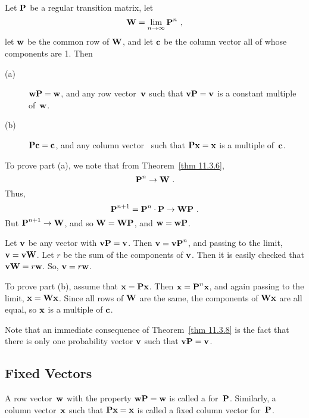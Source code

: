 \begin{theorem}\label{thm 11.3.8}
Let ${\mbox{\bf P}\/}$ be a regular transition matrix, let 
$${\mbox{\bf W}\/} = \lim_{n \rightarrow \infty} {\mbox{\bf P}\/}^n\ ,$$
let ${\mbox{\bf w}\/}$ be the common row of ${\mbox{\bf W}\/}$, and let ${\mbox{\bf c}\/}$ be the column
vector all of
whose components are 1.  Then
\begin{description}
\item[(a)]
${\mbox{\bf w}\/}{\mbox{\bf P}\/} =
{\mbox{\bf w}\/}$, and any row vector~${\mbox{\bf v}\/}$ such that ${\mbox{\bf v}\/}{\mbox{\bf P}\/} = {\mbox{\bf v}\/}$ is
a constant
multiple of~${\mbox{\bf w}\/}$.  
\item[(b)]
${\mbox{\bf P}\/}{\mbox{\bf c}\/} = {\mbox{\bf c}\/}$, and any column vector~ such that
${\mbox{\bf P}\/}{\mbox{\bf x}\/} =
{\mbox{\bf x}\/}$ is a multiple of~${\mbox{\bf c}\/}$.
\end{description}
\proof
To prove part (a), we note that from Theorem~\ref{thm 11.3.6}, 
$$
{\mbox{\bf P}\/}^n \to {\mbox{\bf W}\/}\ .
$$
Thus,
$$
{\mbox{\bf P}\/}^{n + 1} = {\mbox{\bf P}\/}^n \cdot {\mbox{\bf P}\/} \to {\mbox{\bf W}\/}{\mbox{\bf P}\/}\ .
$$
But ${\mbox{\bf P}\/}^{n + 1} \to {\mbox{\bf W}\/}$, and so ${\mbox{\bf W}\/} = {\mbox{\bf W}\/}{\mbox{\bf P}\/}$, and
${\mbox{\bf w}\/} =
{\mbox{\bf w}\/}{\mbox{\bf P}\/}$. 
\par
Let ${\mbox{\bf v}\/}$ be any vector 
with ${\mbox{\bf v}\/} {\mbox{\bf P}\/} = {\mbox{\bf v}\/}$.  Then ${\mbox{\bf v}\/} = {\mbox{\bf v}\/} {\mbox{\bf P}\/}^n$, and
passing to
the limit, ${\mbox{\bf v}\/} = {\mbox{\bf v}\/} {\mbox{\bf W}\/}$.   Let $r$ be the sum of the components
of ${\mbox{\bf v}\/}$.
Then it is easily checked that ${\mbox{\bf v}\/}{\mbox{\bf W}\/} = r{\mbox{\bf w}\/}$.  So, ${\mbox{\bf v}\/} =
r{\mbox{\bf w}\/}$.
\par
To prove part (b), assume that ${\mbox{\bf x}\/} = {\mbox{\bf P}\/} {\mbox{\bf x}\/}$.  Then ${\mbox{\bf x}\/} =
{\mbox{\bf P}\/}^n
{\mbox{\bf x}\/}$, and again passing to the limit, ${\mbox{\bf x}\/} =  {\mbox{\bf W}\/}{\mbox{\bf x}\/}$.  Since
all rows of
${\mbox{\bf W}\/}$ are the same, the components of ${\mbox{\bf W}\/}{\mbox{\bf x}\/}$ are all equal, so
${\mbox{\bf x}\/}$ is a
multiple of ${\mbox{\bf c}\/}$.
\end{theorem}

Note that an immediate consequence of Theorem~\ref{thm 11.3.8} is the fact that
there is only
one probability vector ${\mbox{\bf v}\/}$ such that ${\mbox{\bf v}\/}{\mbox{\bf P}\/} = {\mbox{\bf v}\/}$.

\subsection*{Fixed Vectors}
\begin{definition}\label{def 11.3.1}
A row vector~${\mbox{\bf w}\/}$ with the property ${\mbox{\bf w}\/}{\mbox{\bf P}\/} = {\mbox{\bf w}\/}$ is called a
 for~${\mbox{\bf P}\/}$.  Similarly, a
column
vector~${\mbox{\bf x}\/}$ such that ${\mbox{\bf P}\/}{\mbox{\bf x}\/} = {\mbox{\bf x}\/}$ is called a \emx 
{fixed column vector} for~${\mbox{\bf P}\/}$.  
\end{definition}

